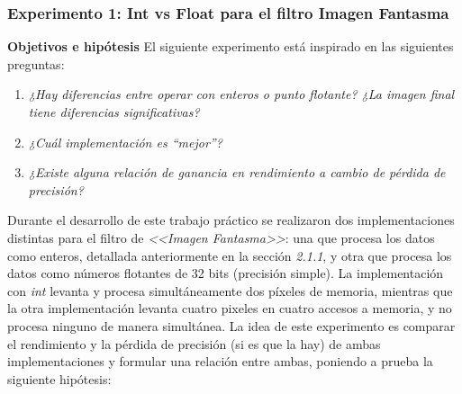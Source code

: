 \documentclass[a4paper]{article}
\begin{document}
\subsubsection{Experimento 1: Int vs Float para el filtro Imagen Fantasma}

\justify
\textbf{Objetivos e hipótesis}
\justify
El siguiente experimento está inspirado en las siguientes preguntas:
\justify
\begin{enumerate}
	\item \textit{¿Hay diferencias entre operar con enteros o punto flotante? ¿La imagen final tiene diferencias significativas?}
	\item \textit{¿Cuál implementación es “mejor”?}
	\item \textit{¿Existe alguna relación de ganancia en rendimiento a cambio de pérdida de precisión?}
\end{enumerate}

\justify
Durante el desarrollo de este trabajo práctico se realizaron dos implementaciones distintas para el filtro de \textit{<<Imagen Fantasma>>}: una que procesa los datos como enteros, detallada anteriormente en la sección \textit{2.1.1}, y otra que procesa los datos como números flotantes de 32 bits (precisión simple). La implementación con \textit{int} levanta y procesa simultáneamente dos píxeles de memoria, mientras que la otra implementación levanta cuatro pixeles en cuatro accesos a memoria, y no procesa ninguno de manera simultánea. La idea de este experimento es comparar el rendimiento y la pérdida de precisión (si es que la hay) de ambas implementaciones y formular una relación entre ambas, poniendo a prueba la siguiente hipótesis:
\end{document}

